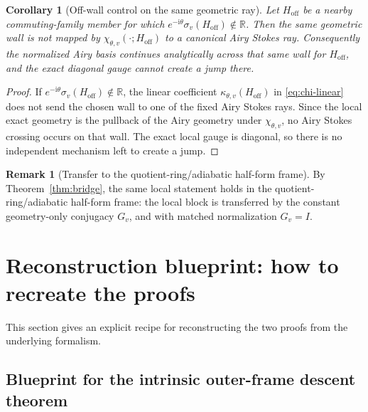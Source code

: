 \documentclass[11pt]{article}
\numberwithin{equation}{section}
\newtheorem{corollary}[theorem]{Corollary}
\theoremstyle{definition}
\newtheorem{remark}[theorem]{Remark}
\newcommand{\ii}{\mathrm i}
\begin{document}
\begin{corollary}[Off-wall control on the same geometric ray]
\label{cor:offwall}
Let $H_{\mathrm{off}}$ be a nearby commuting-family member for which $e^{-\ii\theta}\sigma_v(H_{\mathrm{off}})\notin\mathbb R$. Then the same geometric wall is \emph{not} mapped by $\chi_{\theta,v}(\cdot;H_{\mathrm{off}})$ to a canonical Airy Stokes ray. Consequently the normalized Airy basis continues analytically across that same wall for $H_{\mathrm{off}}$, and the exact diagonal gauge cannot create a jump there.
\end{corollary}

\begin{proof}
If $e^{-\ii\theta}\sigma_v(H_{\mathrm{off}})\notin\mathbb R$, the linear coefficient $\kappa_{\theta,v}(H_{\mathrm{off}})$ in \eqref{eq:chi-linear} does not send the chosen wall to one of the fixed Airy Stokes rays. Since the local exact geometry is the pullback of the Airy geometry under $\chi_{\theta,v}$, no Airy Stokes crossing occurs on that wall. The exact local gauge is diagonal, so there is no independent mechanism left to create a jump.
\end{proof}

\begin{remark}[Transfer to the quotient-ring/adiabatic half-form frame]
By Theorem~\ref{thm:bridge}, the same local statement holds in the quotient-ring/adiabatic half-form frame: the local block is transferred by the constant geometry-only conjugacy $G_v$, and with matched normalization $G_v=I$.
\end{remark}

\section{Reconstruction blueprint: how to recreate the proofs}
\label{sec:reconstruction}

This section gives an explicit recipe for reconstructing the two proofs from the underlying formalism.

\subsection{Blueprint for the intrinsic outer-frame descent theorem}
\end{document}
